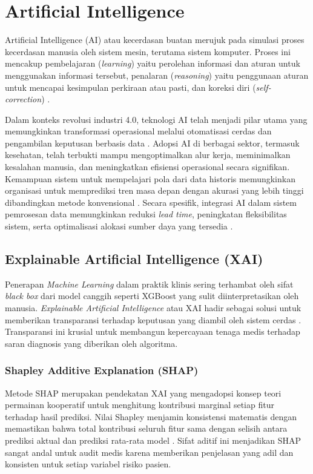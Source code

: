 \section{Artificial Intelligence}
Artificial Intelligence (AI) atau kecerdasan buatan merujuk pada simulasi proses kecerdasan manusia oleh sistem mesin, terutama sistem komputer. Proses ini mencakup pembelajaran (\textit{learning}) yaitu perolehan informasi dan aturan untuk menggunakan informasi tersebut, penalaran (\textit{reasoning}) yaitu penggunaan aturan untuk mencapai kesimpulan perkiraan atau pasti, dan koreksi diri (\textit{self-correction}) \parencite{Davenport2019Potential}.

Dalam konteks revolusi industri 4.0, teknologi AI telah menjadi pilar utama yang memungkinkan transformasi operasional melalui otomatisasi cerdas dan pengambilan keputusan berbasis data \parencite{Javaid2022Artificial}. Adopsi AI di berbagai sektor, termasuk kesehatan, telah terbukti mampu mengoptimalkan alur kerja, meminimalkan kesalahan manusia, dan meningkatkan efisiensi operasional secara signifikan. Kemampuan sistem untuk mempelajari pola dari data historis memungkinkan organisasi untuk memprediksi tren masa depan dengan akurasi yang lebih tinggi dibandingkan metode konvensional \parencite{Secinaro2021Role}. Secara spesifik, integrasi AI dalam sistem pemrosesan data memungkinkan reduksi \textit{lead time}, peningkatan fleksibilitas sistem, serta optimalisasi alokasi sumber daya yang tersedia \parencite{Haleem2022Understanding}.
\subsection{Explainable Artificial Intelligence (XAI)}
Penerapan \textit{Machine Learning} dalam praktik klinis sering terhambat oleh sifat \textit{black box} dari model canggih seperti XGBoost yang sulit diinterpretasikan oleh manusia. \textit{Explainable Artificial Intelligence} atau XAI hadir sebagai solusi untuk memberikan transparansi terhadap keputusan yang diambil oleh sistem cerdas \parencite{Adadi2018}. Transparansi ini krusial untuk membangun kepercayaan tenaga medis terhadap saran diagnosis yang diberikan oleh algoritma.

\subsubsection{Shapley Additive Explanation (SHAP)}
Metode SHAP merupakan pendekatan XAI yang mengadopsi konsep teori permainan kooperatif untuk menghitung kontribusi marginal setiap fitur terhadap hasil prediksi. Nilai Shapley menjamin konsistensi matematis dengan memastikan bahwa total kontribusi seluruh fitur sama dengan selisih antara prediksi aktual dan prediksi rata-rata model \parencite{Lundberg2017Unified}. Sifat aditif ini menjadikan SHAP sangat andal untuk audit medis karena memberikan penjelasan yang adil dan konsisten untuk setiap variabel risiko pasien.

